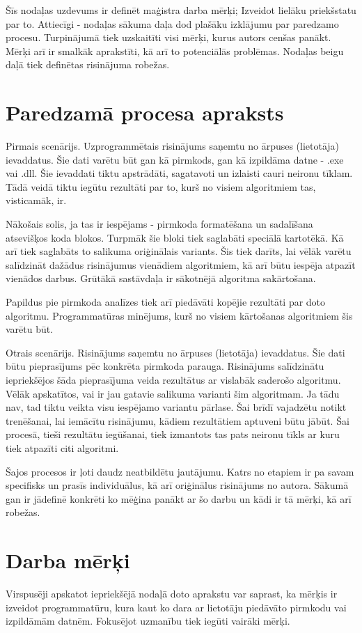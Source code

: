Šīs nodaļas uzdevums ir definēt maģistra darba mērķi; Izveidot lielāku priekšstatu par to. Attiecīgi - nodaļas sākuma daļa dod plašāku izklājumu par paredzamo procesu. Turpinājumā tiek uzskaitīti visi mērķi, kurus autors cenšas panākt. Mērķi arī ir smalkāk aprakstīti, kā arī to potenciālās problēmas. Nodaļas beigu daļā tiek definētas risinājuma robežas.

\section{Paredzamā procesa apraksts}
Pirmais scenārijs. Uzprogrammētais risinājums saņemtu no ārpuses (lietotāja) ievaddatus. Šie dati varētu būt gan kā pirmkods, gan kā izpildāma datne - .exe vai .dll. Šie ievaddati tiktu apstrādāti, sagatavoti un izlaisti cauri neironu tīklam. Tādā veidā tiktu iegūtu rezultāti par to, kurš no visiem algoritmiem tas, visticamāk, ir. 

Nākošais solis, ja tas ir iespējams - pirmkoda formatēšana un sadalīšana atsevišķos koda blokos. Turpmāk šie bloki tiek saglabāti speciālā kartotēkā. Kā arī tiek saglabāts to salikuma oriģinālais variants. Šis tiek darīts, lai vēlāk varētu salīdzināt dažādus risinājumus vienādiem algoritmiem, kā arī būtu iespēja atpazīt vienādos darbus. Grūtākā sastāvdaļa ir sākotnējā algoritma sakārtošana.

Papildus pie pirmkoda analīzes tiek arī piedāvāti kopējie rezultāti par doto algoritmu. Programmatūras minējums, kurš no visiem kārtošanas algoritmiem šis varētu būt. 

Otrais scenārijs. Risinājums saņemtu no ārpuses (lietotāja) ievaddatus. Šie dati būtu pieprasījums pēc konkrēta pirmkoda parauga. Risinājums salīdzinātu iepriekšējos šāda pieprasījuma veida rezultātus ar vislabāk saderošo algoritmu. Vēlāk apskatītos, vai ir jau gatavie salikuma varianti šim algoritmam. Ja tādu nav, tad tiktu veikta visu iespējamo variantu pārlase. Šai brīdī vajadzētu notikt trenēšanai, lai iemācītu risinājumu, kādiem rezultātiem aptuveni būtu jābūt. Šai procesā, tieši rezultātu iegūšanai, tiek izmantots tas pats neironu tīkls ar kuru tiek atpazīti citi algoritmi.

Šajos procesos ir ļoti daudz neatbildētu jautājumu. Katrs no etapiem ir pa savam specifisks un prasīs individuālus, kā arī oriģinālus risinājums no autora. Sākumā gan ir jādefinē konkrēti ko mēģina panākt ar šo darbu un kādi ir tā mērķi, kā arī robežas.

\section{Darba mērķi}
Virspusēji apskatot iepriekšējā nodaļā doto aprakstu var saprast, ka mērķis ir izveidot programmatūru, kura kaut ko dara ar lietotāju piedāvāto pirmkodu vai izpildāmām datnēm. Fokusējot uzmanību tiek iegūti vairāki mērķi.

